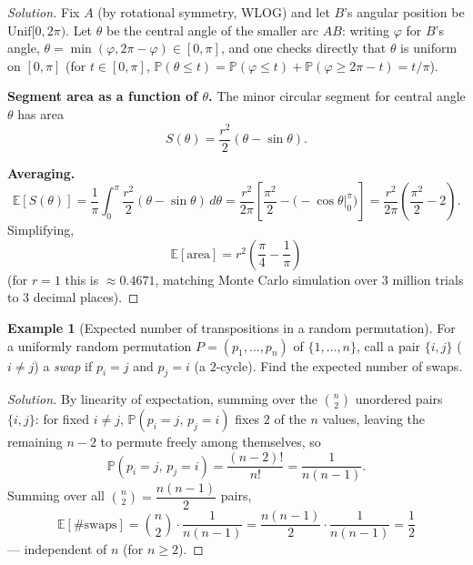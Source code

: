 \documentclass[11pt]{article}
\theoremstyle{definition}
\newtheorem{example}{Example}[section]
\newcommand{\E}{\mathbb{E}}
\begin{document}
\begin{proof}[Solution]
Fix $A$ (by rotational symmetry, WLOG) and let $B$'s angular position be $\mathrm{Unif}[0,2\pi)$. Let $\theta$ be the central angle of the smaller arc $AB$: writing $\varphi$ for $B$'s angle, $\theta=\min(\varphi,2\pi-\varphi)\in[0,\pi]$, and one checks directly that $\theta$ is uniform on $[0,\pi]$ (for $t\in[0,\pi]$, $\mathbb P(\theta\le t)=\mathbb P(\varphi\le t)+\mathbb P(\varphi\ge2\pi-t)=t/\pi$).

\textbf{Segment area as a function of $\theta$.} The minor circular segment for central angle $\theta$ has area
\[
S(\theta)=\frac{r^2}2(\theta-\sin\theta).
\]

\textbf{Averaging.}
\[
\E[S(\theta)]=\frac1\pi\int_0^\pi \frac{r^2}2(\theta-\sin\theta)\,d\theta=\frac{r^2}{2\pi}\left[\frac{\pi^2}2-\Big(-\cos\theta\Big|_0^\pi\Big)\right]=\frac{r^2}{2\pi}\left(\frac{\pi^2}2-2\right).
\]
Simplifying,
\[
\boxed{\E[\text{area}]=r^2\left(\frac\pi4-\frac1\pi\right)}
\]
(for $r=1$ this is $\approx0.4671$, matching Monte Carlo simulation over $3$ million trials to $3$ decimal places).
\end{proof}

\begin{example}[Expected number of transpositions in a random permutation]
For a uniformly random permutation $P=(p_1,\dots,p_n)$ of $\{1,\dots,n\}$, call a pair $\{i,j\}$ ($i\ne j$) a \emph{swap} if $p_i=j$ and $p_j=i$ (a $2$-cycle). Find the expected number of swaps.
\end{example}

\begin{proof}[Solution]
By linearity of expectation, summing over the $\binom n2$ unordered pairs $\{i,j\}$: for fixed $i\ne j$, $\mathbb P(p_i=j,\,p_j=i)$ fixes $2$ of the $n$ values, leaving the remaining $n-2$ to permute freely among themselves, so
\[
\mathbb P(p_i=j,\,p_j=i)=\frac{(n-2)!}{n!}=\frac1{n(n-1)}.
\]
Summing over all $\binom n2=\dfrac{n(n-1)}2$ pairs,
\[
\E[\#\text{swaps}]=\binom n2\cdot\frac1{n(n-1)}=\frac{n(n-1)}2\cdot\frac1{n(n-1)}=\boxed{\frac12}
\]
— independent of $n$ (for $n\ge2$).
\end{proof}
\end{document}
